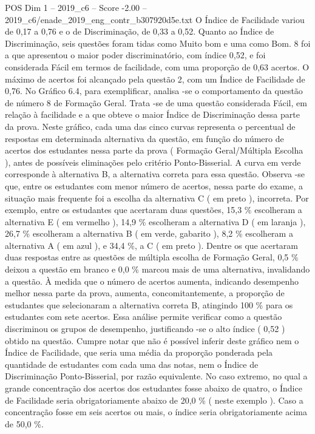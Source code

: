 \begin{textsample}{POS Dim 1 – 2019\_c6 – Score -2.00 – 2019\_c6/enade\_2019\_eng\_contr\_b307920d5e.txt}
O Índice de Facilidade variou de 0,17 a 0,76 e o de Discriminação, de 0,33 a 0,52.
Quanto ao Índice de Discriminação, seis questões foram tidas como Muito bom e uma como Bom. 8 foi a que apresentou o maior poder discriminatório, com índice 0,52, e foi considerada Fácil em termos de facilidade, com uma proporção de 0,63 acertos.
O máximo de acertos foi alcançado pela questão 2, com um Índice de Facilidade de 0,76.
No Gráfico 6.4, para exemplificar, analisa -se o comportamento da questão de número 8 de Formação Geral.
Trata -se de uma questão considerada Fácil, em relação à facilidade e a que obteve o maior Índice de Discriminação dessa parte da prova.
Neste gráfico, cada uma das cinco curvas representa o percentual de respostas em determinada alternativa da questão, em função do número de acertos dos estudantes nessa parte da prova ( Formação Geral/Múltipla Escolha ), antes de possíveis eliminações pelo critério Ponto-Bisserial.
A curva em verde corresponde à alternativa B, a alternativa correta para essa questão.
Observa -se que, entre os estudantes com menor número de acertos, nessa parte do exame, a situação mais frequente foi a escolha da alternativa C ( em preto ), incorreta.
Por exemplo, entre os estudantes que acertaram duas questões, 15,3 \% escolheram a alternativa E ( em vermelho ), 14,9 \% escolheram a alternativa D ( em laranja ), 26,7 \% escolheram a alternativa B ( em verde, gabarito ), 8,2 \% escolheram a alternativa A ( em azul ), e 34,4 \%, a C ( em preto ).
Dentre os que acertaram duas respostas entre as questões de múltipla escolha de Formação Geral, 0,5 \% deixou a questão em branco e 0,0 \% marcou mais de uma alternativa, invalidando a questão.
À medida que o número de acertos aumenta, indicando desempenho melhor nessa parte da prova, aumenta, concomitantemente, a proporção de estudantes que selecionaram a alternativa correta B, atingindo 100 \% para os estudantes com sete acertos.
Essa análise permite verificar como a questão discriminou os grupos de desempenho, justificando -se o alto índice ( 0,52 ) obtido na questão.
Cumpre notar que não é possível inferir deste gráfico nem o Índice de Facilidade, que seria uma média da proporção ponderada pela quantidade de estudantes com cada uma das notas, nem o Índice de Discriminação Ponto-Bisserial, por razão equivalente.
No caso extremo, no qual a grande concentração dos acertos dos estudantes fosse abaixo de quatro, o Índice de Facilidade seria obrigatoriamente abaixo de 20,0 \% ( neste exemplo ).
Caso a concentração fosse em seis acertos ou mais, o índice seria obrigatoriamente acima de 50,0 \%.

\end{textsample}
